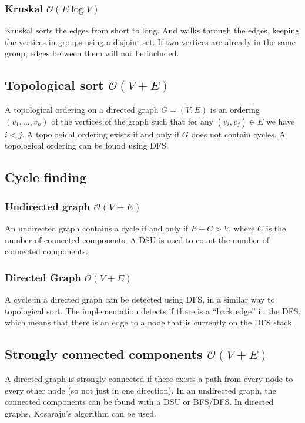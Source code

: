 \subsubsection{Kruskal $\mathcal O(E\log V)$}
Kruskal sorts the edges from short to long. And walks through the edges, keeping the vertices in groups using a disjoint-set. If two vertices are already in the same group, edges between them will not be included.



\subsection{Topological sort $\mathcal O(V + E)$}

A topological ordering on a directed graph $G = (V, E)$ is an ordering $(v_1, \dots, v_n)$ of the vertices of the graph such that for any $(v_i, v_j) \in E$ we have $i < j$. A topological ordering exists if and only if $G$ does not contain cycles. A topological ordering can be found using DFS.



\subsection{Cycle finding}

\subsubsection{Undirected graph $\mathcal O(V + E)$}
An undirected graph contains a cycle if and only if $E + C > V$, where $C$ is the number of connected components. A DSU is used to count the number of connected components.

\subsubsection{Directed Graph $\mathcal O(V + E)$}
A cycle in a directed graph can be detected using DFS, in a similar way to topological sort. The implementation detects if there is a ``back edge'' in the DFS, which means that there is an edge to a node that is currently on the DFS stack.



\subsection{Strongly connected components $\mathcal O(V + E)$}
A directed graph is strongly connected if there exists a path from every node to every other node (so not just in one direction). In an undirected graph, the connected components can be found with a DSU or BFS/DFS. In directed graphs, Kosaraju's algorithm can be used.


